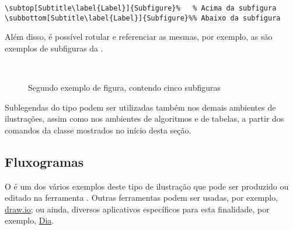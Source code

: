 \begin{snugshade}
\begin{Verbatim}
\subtop[Subtitle\label{Label}]{Subfigure}%   % Acima da subfigura
\subbottom[Subtitle\label{Label}]{Subfigure}%% Abaixo da subfigura
\end{Verbatim}
\end{snugshade}

Além disso, é possível rotular e referenciar as mesmas, por exemplo, as  são exemplos de subfiguras da .

\begin{figure}[!htbp]
\SetCaptionWidth{\textwidth}
\caption{Segundo exemplo de figura, contendo cinco subfiguras}%
\label{fig:subfig}
%
\hspace*{0.05\CaptionWidth}%
%
\hspace*{0.05\CaptionWidth}%
%
\\%
%
\hspace*{0.05\CaptionWidth}%
%
\end{figure}

Sublegendas do tipo  podem ser utilizadas também nos demais ambientes de ilustrações, assim como nos ambientes de algoritmos e de tabelas, a partir dos comandos da classe \texttt{} mostrados no início desta seção.

\subsection{Fluxogramas}%
\label{ssect:fcht}

O  é um dos vários exemplos deste tipo de ilustração que pode ser produzido ou editado na ferramenta .
Outras ferramentas  podem ser usadas, por exemplo, \href{https://www.drawio.com}{draw.io\LinkIcon}; ou ainda, diversos aplicativos específicos para esta finalidade, por exemplo, \href{http://dia-installer.de/}{Dia\LinkIcon}.

